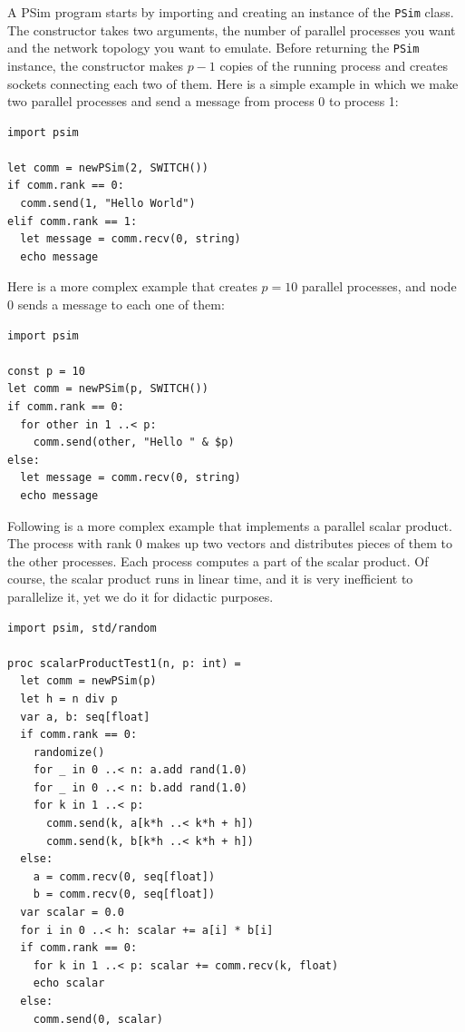 \documentclass[justified, sixbynine]{tufte-book}
\def\ft{\small\tt}
\theoremstyle{plain}%
\newtheorem * {corollary}{Corollary}
\theoremstyle{definition}
\theoremstyle{remark}
\newtheorem * {remark}{Remark}
\newtheorem * {note}{Note}
\begin{document}
\begin{fullwidth}
A PSim program starts by importing and creating an instance of the {\ft PSim} class. The constructor takes two arguments, the number of parallel processes you want and the network topology you want to emulate. Before returning the {\ft PSim} instance, the constructor makes $p-1$ copies of the running process and creates sockets connecting each two of them. Here is a simple example in which we make two parallel processes and send a message from process 0 to process 1:

\begin{lstlisting}
import psim

let comm = newPSim(2, SWITCH())
if comm.rank == 0:
  comm.send(1, "Hello World")
elif comm.rank == 1:
  let message = comm.recv(0, string)
  echo message
\end{lstlisting}

Here is a more complex example that creates $p=10$ parallel processes, and node 0 sends a message to each one of them:


\begin{lstlisting}
import psim

const p = 10
let comm = newPSim(p, SWITCH())
if comm.rank == 0:
  for other in 1 ..< p:
    comm.send(other, "Hello " & $p)
else:
  let message = comm.recv(0, string)
  echo message
\end{lstlisting}

 Following is a more complex example that implements a parallel scalar product. The process with rank 0 makes up two vectors and distributes pieces of them to the other processes. Each process computes a part of the scalar product. Of course, the scalar product runs in linear time, and it is very inefficient to parallelize it, yet we do it for didactic purposes.


\begin{lstlisting}[caption={in file: {\ft psim\_scalar.nim}}]
import psim, std/random

proc scalarProductTest1(n, p: int) =
  let comm = newPSim(p)
  let h = n div p
  var a, b: seq[float]
  if comm.rank == 0:
    randomize()
    for _ in 0 ..< n: a.add rand(1.0)
    for _ in 0 ..< n: b.add rand(1.0)
    for k in 1 ..< p:
      comm.send(k, a[k*h ..< k*h + h])
      comm.send(k, b[k*h ..< k*h + h])
  else:
    a = comm.recv(0, seq[float])
    b = comm.recv(0, seq[float])
  var scalar = 0.0
  for i in 0 ..< h: scalar += a[i] * b[i]
  if comm.rank == 0:
    for k in 1 ..< p: scalar += comm.recv(k, float)
    echo scalar
  else:
    comm.send(0, scalar)


\end{lstlisting}
\end{fullwidth}
\end{document}
